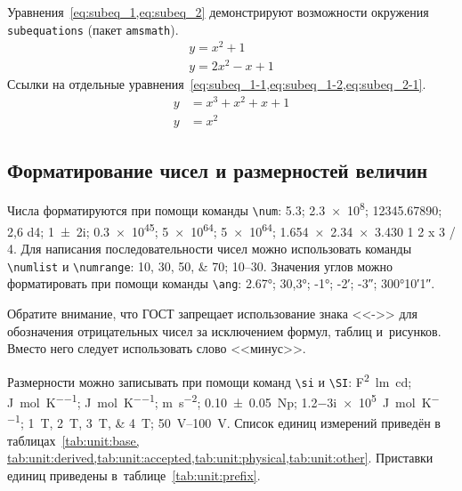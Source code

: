 Уравнения~\cref{eq:subeq_1,eq:subeq_2} демонстрируют возможности
окружения \verb|subequations| (пакет \verb|amsmath|).
\begin{subequations}
    \label{eq:subeq_1}
    \begin{gather}
        y = x^2 + 1 \label{eq:subeq_1-1} \\
        y = 2 x^2 - x + 1 \label{eq:subeq_1-2}
    \end{gather}
\end{subequations}
Ссылки на отдельные уравнения~\cref{eq:subeq_1-1,eq:subeq_1-2,eq:subeq_2-1}.
\begin{subequations}
    \label{eq:subeq_2}
    \begin{align}
        y & = x^3 + x^2 + x + 1 \label{eq:subeq_2-1} \\
        y & = x^2
    \end{align}
\end{subequations}

\subsection{Форматирование чисел и размерностей величин}\label{sec:units}

Числа форматируются при помощи команды \verb|\num|:
\num{5,3};
\num{2,3e8};
\num{12345,67890};
\num{2,6 d4};
\num{1+-2i};
\num{.3e45};
\num[exponent-base=2]{5 e64};
\num[exponent-base=2,exponent-to-prefix]{5 e64};
\num{1.654 x 2.34 x 3.430}
\num{1 2 x 3 / 4}.
Для написания последовательности чисел можно использовать команды \verb|\numlist| и \verb|\numrange|:
\numlist{10;30;50;70}; \numrange{10}{30}.
Значения углов можно форматировать при помощи команды \verb|\ang|:
\ang{2.67};
\ang{30,3};
\ang{-1;;};
\ang{;-2;};
\ang{;;-3};
\ang{300;10;1}.

Обратите внимание, что ГОСТ запрещает использование знака <<->> для обозначения отрицательных чисел
за исключением формул, таблиц и~рисунков.
Вместо него следует использовать слово <<минус>>.

Размерности можно записывать при помощи команд \verb|\si| и \verb|\SI|:
\si{\farad\squared\lumen\candela};
\si{\joule\per\mole\per\kelvin};
\si[per-mode = symbol-or-fraction]{\joule\per\mole\per\kelvin};
\si{\metre\per\second\squared};
\SI{0.10(5)}{\neper};
\SI{1.2-3i e5}{\joule\per\mole\per\kelvin};
\SIlist{1;2;3;4}{\tesla};
\SIrange{50}{100}{\volt}.
Список единиц измерений приведён в таблицах~\cref{tab:unit:base,
    tab:unit:derived,tab:unit:accepted,tab:unit:physical,tab:unit:other}.
Приставки единиц приведены в~таблице~\cref{tab:unit:prefix}.

